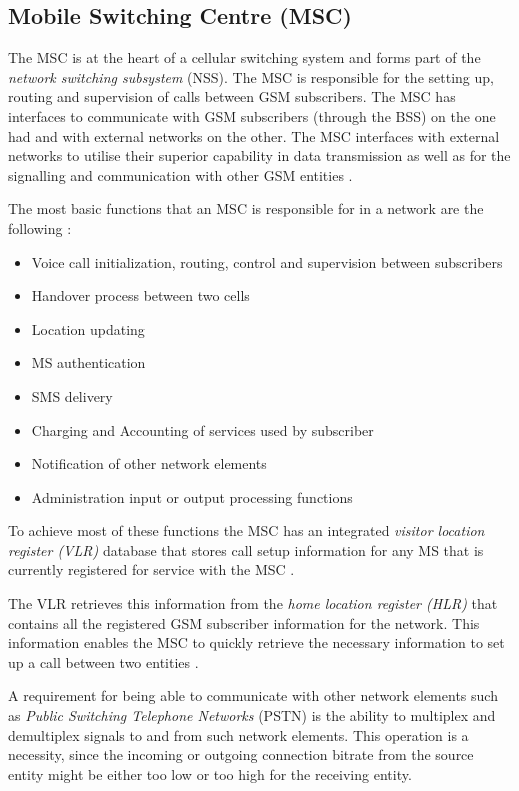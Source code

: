 \subsection{Mobile Switching Centre (MSC)}

The MSC is at the heart of a cellular switching system and forms part of the \emph{network switching subsystem} (NSS). The MSC is responsible for the setting up, routing and supervision of calls between GSM subscribers\cite{GSM92,GSMSysEngin}. The MSC has interfaces to communicate with GSM subscribers (through the BSS) on the one had and with external networks on the other\cite{GSM92}. The MSC interfaces with external networks to utilise their superior capability in data transmission as well as for the signalling and communication with other GSM entities \cite{GSM92}. 

The most basic functions that an MSC is responsible for in a network are the following \cite{wirelesstelcoMullet}:
\begin{itemize}
\item Voice call initialization, routing, control and supervision between subscribers
\item Handover process between two cells
\item Location updating
\item MS authentication
\item SMS delivery
\item Charging and Accounting of services used by subscriber
\item Notification of other network elements
\item Administration input or output processing functions
\end{itemize}

To achieve most of these functions the MSC has an integrated \emph{visitor location register (VLR)} database that stores call setup information for any MS that is currently registered for service with the MSC \cite{GSM92,wirelesstelcoMullet}. 

The VLR retrieves this information from the \emph{home location register (HLR)} that contains all the registered GSM subscriber information for the network. This information enables the MSC to quickly retrieve the necessary information to set up a call between two entities \cite{GSMSysEngin,GSMSecurInTeleNetwork}.

A requirement for being able to communicate with other network elements such as \emph{Public Switching Telephone Networks} (PSTN) is the ability to multiplex and demultiplex signals to and from such network elements. This operation is a necessity, since the incoming or outgoing connection bitrate from the source entity might be either too low or too high for the receiving entity.


